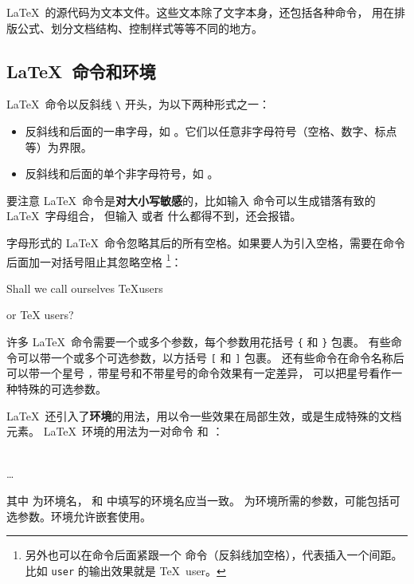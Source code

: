 \LaTeX\ 的源代码为文本文件。这些文本除了文字本身，还包括各种命令，
用在排版公式、划分文档结构、控制样式等等不同的地方。

\subsection{\LaTeX\ 命令和环境}\label{subsec:cmds}

\LaTeX\ 命令以反斜线 \texttt{\textbackslash} 开头，为以下两种形式之一：
\begin{itemize}
  \item 反斜线和后面的一串字母，如 。它们以任意非字母符号（空格、数字、标点等）为界限。
  \item 反斜线和后面的单个非字母符号，如 \cmd{\$}。
\end{itemize}

要注意 \LaTeX\ 命令是\textbf{对大小写敏感}的，比如输入  命令可以生成错落有致的 \LaTeX\ 字母组合，
但输入  或者  什么都得不到，还会报错。

字母形式的 \LaTeX\ 命令忽略其后的所有空格。如果要人为引入空格，需要在命令后面加一对括号阻止其忽略空格%
\footnote{另外也可以在命令后面紧跟一个 \cmd{\textvisiblespace} 命令（反斜线加空格），代表插入一个间距。
比如 \cmd{\textvisiblespace}\texttt{user} 的输出效果就是 \TeX\ user。}：
\begin{example}
Shall we call ourselves 
\TeX users 

or \TeX{} users?
\end{example}

许多 \LaTeX\ 命令需要一个或多个参数，每个参数用花括号 \texttt\{ 和 \texttt\} 包裹。
有些命令可以带一个或多个可选参数，以方括号 \texttt[ 和 \texttt] 包裹。
还有些命令在命令名称后可以带一个星号 \texttt*，带星号和不带星号的命令效果有一定差异，
可以把星号看作一种特殊的可选参数。

\LaTeX\ 还引入了\textbf{环境}的用法，用以令一些效果在局部生效，或是生成特殊的文档元素。
\LaTeX\ 环境的用法为一对命令  和 ：
\begin{command}
 \\
\ldots \\
\end{command}

其中  为环境名， 和  中填写的环境名应当一致。
 为环境所需的参数，可能包括可选参数。环境允许嵌套使用。

